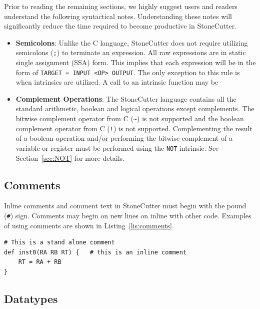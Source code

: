 \documentclass{article}
\begin{document}
Prior to reading the remaining sections, we highly suggest users and readers 
understand the following syntactical notes.  Understanding these notes will significantly 
reduce the time required to become productive in StoneCutter.  

\begin{itemize}
\item \textbf{Semicolons}: Unlike the C language, StoneCutter does not require utilizing semicolons (\texttt{;}) 
to terminate an expression.  All raw expressions are in static single assignment (SSA) form.  This implies 
that each expression will be in the form of \texttt{TARGET = INPUT <OP> OUTPUT}.  The only exception 
to this rule is when intrinsics are utilized.  A call to an intrinsic function may be

\item \textbf{Complement Operations}: The StoneCutter language contains all the standard arithmetic, boolean 
and logical operations except complements.  The bitwise complement operator from C (\texttt{\~}) is not supported 
and the boolean complement operator from C (\texttt{!}) is not supported.  Complementing the result of a boolean 
operation and/or performing the bitwise complement of a variable or register must be performed using the \texttt{NOT} 
intrinsic.  See Section~\ref{sec:NOT} for more details.   
\end{itemize}

\clearpage
\subsection{Comments}
\label{sec:Comments}

Inline comments and comment text in StoneCutter must begin with the pound (\texttt{\#}) sign.  Comments 
may begin on new lines on inline with other code.  Examples of using comments are shown in Listing~\ref{lis:comments}.  

\vspace{0.125in}
\begin{lstlisting}[frame=single,style=base,caption={StoneCutter Comments},captionpos=b,label={lis:comments}]
# This is a stand alone comment
def inst0(RA RB RT) {   # this is an inline comment
	RT = RA + RB
}
\end{lstlisting}

\clearpage
\subsection{Datatypes}
\label{sec:Datatypes}
\end{document}
